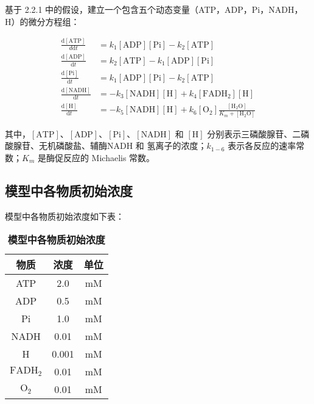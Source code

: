 \documentclass{ctexart}
\begin{document}
基于 2.2.1 中的假设，建立一个包含五个动态变量（ATP，ADP，Pi，NADH，H）的微分方程组：

$$
    \begin{aligned}
        \frac{\mathrm{d}[\text{ATP}]}{d\mathrm{d}t} & = k_{1}[\text{ADP}] [\text{Pi}] - k_2 [\text{ATP}]                                                             \\
        \frac{\mathrm{d}[\text{ADP}]}{\mathrm{d}t}  & = k_{2} [\text{ATP}] - k_{1} [\text{ADP}] [\text{Pi}]                                                          \\
        \frac{\mathrm{d}[\text{Pi}]}{\mathrm{d}t}   & = k_{1} [\text{ADP}] [\text{Pi}] - k_{2} [\text{ATP}]                                                          \\
        \frac{\mathrm{d}[\text{NADH}]}{\mathrm{d}t} & = -k_{3} [\text{NADH}] [\text{H}] + k_{4} [\text{FADH}_2] [\text{H}]                                           \\
        \frac{\mathrm{d}[\text{H}]}{\mathrm{d}t}    & = -k_{5} [\text{NADH}] [\text{H}] + k_{6} [\text{O}_2]\frac{ [\text{H}_2\text{O}]}{K_m + [\text{H}_2\text{O}]}
    \end{aligned}
$$

其中，$[\text{ATP}]$、$[\text{ADP}]$、$[\text{Pi}]$、$[\text{NADH}]$ 和 $[\text{H}]$ 分别表示三磷酸腺苷、二磷酸腺苷、无机磷酸盐、辅酶NADH 和 氢离子的浓度；$k_{1-6}$ 表示各反应的速率常数；$K_m$ 是酶促反应的 Michaelis 常数。

\subsection{模型中各物质初始浓度}
模型中各物质初始浓度如下表：


\begin{table}[H]
    \centering
    \begin{tabular}{ccc}
        \toprule%
        物质 & 浓度 & 单位\\
        \midrule%
        ATP & 2.0 & mM\\
        ADP & 0.5 & mM\\
        Pi & 1.0 & mM\\
        NADH & 0.01 & mM\\
        H & 0.001 & mM\\
        $\mathrm{FADH_2}$ & 0.01 & mM\\
        $\mathrm{O_2}$ & 0.01 & mM\\
        \bottomrule
    \end{tabular}
    \caption{\textbf{模型中各物质初始浓度}}
\end{table}
\end{document}
